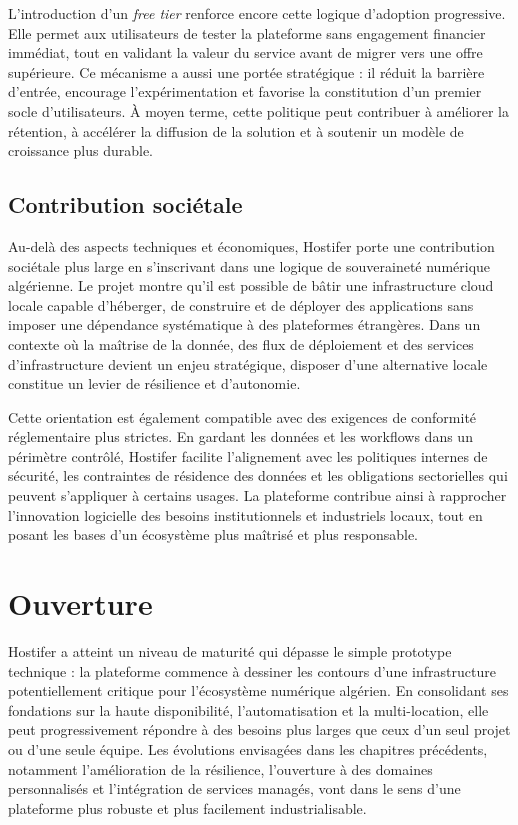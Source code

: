 L'introduction d'un \textit{free tier} renforce encore cette logique d'adoption progressive. Elle permet aux utilisateurs de tester la plateforme sans engagement financier immédiat, tout en validant la valeur du service avant de migrer vers une offre supérieure. Ce mécanisme a aussi une portée stratégique : il réduit la barrière d'entrée, encourage l'expérimentation et favorise la constitution d'un premier socle d'utilisateurs. À moyen terme, cette politique peut contribuer à améliorer la rétention, à accélérer la diffusion de la solution et à soutenir un modèle de croissance plus durable.

\subsection*{Contribution sociétale}

Au-delà des aspects techniques et économiques, Hostifer porte une contribution sociétale plus large en s'inscrivant dans une logique de souveraineté numérique algérienne. Le projet montre qu'il est possible de bâtir une infrastructure cloud locale capable d'héberger, de construire et de déployer des applications sans imposer une dépendance systématique à des plateformes étrangères. Dans un contexte où la maîtrise de la donnée, des flux de déploiement et des services d'infrastructure devient un enjeu stratégique, disposer d'une alternative locale constitue un levier de résilience et d'autonomie.

Cette orientation est également compatible avec des exigences de conformité réglementaire plus strictes. En gardant les données et les workflows dans un périmètre contrôlé, Hostifer facilite l'alignement avec les politiques internes de sécurité, les contraintes de résidence des données et les obligations sectorielles qui peuvent s'appliquer à certains usages. La plateforme contribue ainsi à rapprocher l'innovation logicielle des besoins institutionnels et industriels locaux, tout en posant les bases d'un écosystème plus maîtrisé et plus responsable.


\section*{Ouverture}

Hostifer a atteint un niveau de maturité qui dépasse le simple prototype technique : la plateforme commence à dessiner les contours d'une infrastructure potentiellement critique pour l'écosystème numérique algérien. En consolidant ses fondations sur la haute disponibilité, l'automatisation et la multi-location, elle peut progressivement répondre à des besoins plus larges que ceux d'un seul projet ou d'une seule équipe. Les évolutions envisagées dans les chapitres précédents, notamment l'amélioration de la résilience, l'ouverture à des domaines personnalisés et l'intégration de services managés, vont dans le sens d'une plateforme plus robuste et plus facilement industrialisable.

